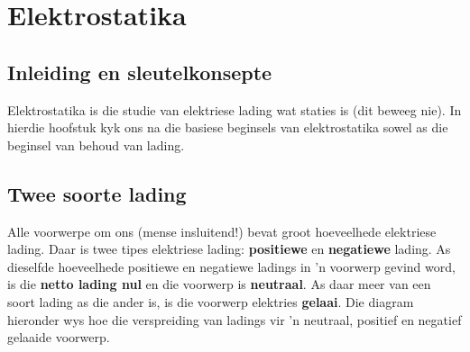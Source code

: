  \chapter{Elektrostatika}
\label{464e844ca5615087ea89d9d95dd9a43a}
 

\section{Inleiding en sleutelkonsepte}
    \nopagebreak
    \label{m38780*cid2}
       
Elektrostatika is die studie van elektriese lading wat staties is (dit beweeg nie). In hierdie hoofstuk kyk ons na die basiese beginsels van elektrostatika sowel as die beginsel van behoud van lading.


\section{Twee soorte lading}
            \nopagebreak

Alle voorwerpe om ons (mense insluitend!) bevat groot hoeveelhede elektriese lading. Daar is twee tipes elektriese lading: \textbf{positiewe} en \textbf{negatiewe} lading. As dieselfde hoeveelhede positiewe en negatiewe ladings in 'n voorwerp gevind word, is die \textbf{netto lading nul} en die voorwerp is \textbf{neutraal}. As daar meer van een soort lading as die ander is, is die voorwerp elektries \textbf{gelaai}. Die diagram hieronder wys hoe die verspreiding van ladings vir 'n neutraal, positief en negatief gelaaide voorwerp. \par


